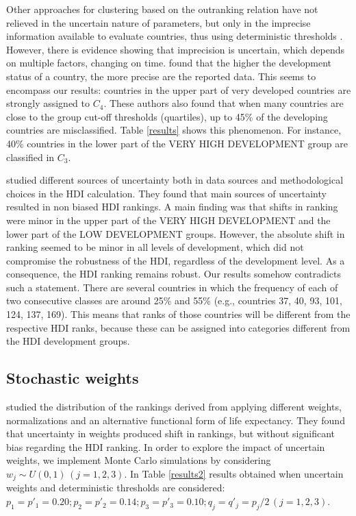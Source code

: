 \documentclass[]{elsarticle}
\theoremstyle{definition}
\begin{document}
Other approaches for clustering based on the outranking relation have not relieved in the uncertain nature of parameters, but only in the imprecise information available to evaluate countries, thus using deterministic thresholds \citep{DeSmet2012, DeSmet2014, Fernandez2010, Chen2018}. However, there is evidence showing that imprecision is uncertain, which depends on multiple factors, changing on time. \cite{Wolff2011} found that  the higher the development status of a country, the more precise are the reported data. This seems to encompass our results: countries in the upper part of very developed countries are strongly assigned to $C_4$.  These authors also found that when many countries are close to the group cut-off thresholds (quartiles), up to 45\% of the developing countries are misclassified.  Table \ref{results} shows this phenomenon. For instance, 40\% countries in the lower part of the VERY HIGH DEVELOPMENT group  are classified in $C_3$.  

\cite{Garcia2010} studied different sources of uncertainty both in data sources and methodological choices in the HDI calculation. They found that main sources of uncertainty resulted in non biased HDI rankings. A main finding was that shifts in ranking were minor in the upper part of the VERY HIGH DEVELOPMENT and the lower part of the LOW DEVELOPMENT  groups. However, the absolute shift in ranking seemed to be minor in all levels of development, which did not compromise the robustness of the HDI, regardless of the development level.  As a consequence, the HDI ranking remains robust.  Our results somehow contradicts such a statement. There are several countries in which the frequency of each of two consecutive classes are around 25\% and 55\% (e.g., countries 37, 40, 93, 101, 124, 137, 169).  This means that ranks of those countries will be different from the respective HDI ranks, because these can be assigned into categories different from the HDI development groups.




\subsection{Stochastic weights}


\cite{Garcia2010}  studied the distribution of the rankings derived from applying different weights, normalizations and an alternative functional form of life expectancy. They found that uncertainty in weights produced shift in rankings, but without significant bias regarding the HDI ranking.  In order to explore the impact of uncertain weights, we implement Monte Carlo simulations by considering $w_j \sim U(0,1) \, (j=1,2,3)$.  In Table \ref{results2} results obtained when uncertain weights and deterministic thresholds are considered:   $p_1=p'_1 =0.20;  p_2=p'_2 =0.14; p_3=p'_3 = 0.10; q_j=q'_j=p_j/2 \,(j=1,2,3)$.  
\end{document}
